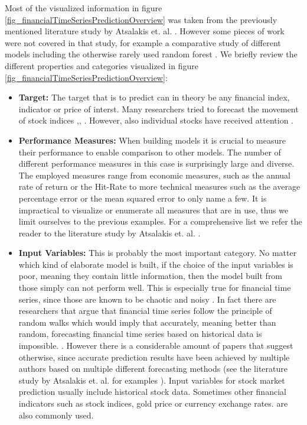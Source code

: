 Most of the visualized information in figure \ref{fig_financialTimeSeriesPredictionOverview} was taken from the previously mentioned literature study by Atsalakis et. al. \cite{atsalakis2009surveying}. However  some pieces of work were not covered in that study, for example a comparative study of different models including the otherwise rarely used random forest \cite{kumar2006forecasting}. We briefly review the different properties and categories visualized in figure 
\ref{fig_financialTimeSeriesPredictionOverview}:

\begin{itemize}
	\item \textbf{Target:} The target that is to predict can in theory be any financial index, indicator or price of interst. Many researchers tried to forecast the movement of stock indices \cite{zhang2009stock},\cite{van2001financial}, \cite{kumar2006forecasting} . However, also individual stocks have received attention \cite{mahfoud1996financial}. 
	\item \textbf{Performance Measures:} When building models it is crucial to measure their performance to enable comparison to other models. The number of different performance measures in this case is surprisingly large and diverse. The employed measures range from economic measures, such as the annual rate of return or the Hit-Rate to more technical measures such as the average percentage error or the mean squared error to only name a few. It is impractical to visualize or enumerate all measures that are in use, thus we limit ourselves to the previous examples. For a comprehensive list we refer the reader to the literature study by Atsalakis et. al. \cite{atsalakis2009surveying}.
	\item \textbf{Input Variables:} This is probably the most important category. No matter which kind of elaborate model is built, if the choice of the input variables is poor, meaning they contain little information, then the model built from those simply can not perform well. This is especially true for financial time series, since those are known to be chaotic and noisy \cite{zhang2009stock}. In fact there are researchers that argue that financial time series follow the principle of random walks which would imply that accurately, meaning better than random, forecasting financial time series based on historical data is impossible. \cite{fama1965behavior}. However there is a considerable amount of papers that suggest otherwise, since accurate prediction results have been achieved by multiple authors based on multiple different forecasting methods (see the literature study by Atsalakis et. al. for examples \cite{atsalakis2009surveying} ). Input variables for stock market prediction usually include historical stock data. Sometimes other financial indicators such as stock indices, gold price or currency exchange rates. are also commonly used.

\end{itemize}
